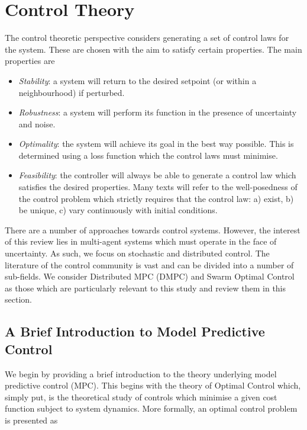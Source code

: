 \documentclass[.../main.tex]{subfiles}
\begin{document}
\section{Control Theory} \label{sec::Control_Theory}

The control theoretic perspective considers generating a set of control laws for the system. These
are chosen with the aim to satisfy certain properties. The main properties are

\begin{itemize}
    \item {\em Stability}: a system will return to the desired setpoint (or within a neighbourhood) if
    perturbed.

    \item {\em Robustness}: a system will perform its function in the presence of uncertainty and
    noise.

    \item {\em Optimality}: the system will achieve its goal in the best way possible. This is
    determined using a loss function which the control laws must minimise.

    \item {\em Feasibility}: the controller will always be able to generate a control law which
    satisfies the desired properties. Many texts will refer to the well-posedness of the control
    problem which strictly requires that the control law: a) exist, b) be unique, c) vary
    continuously with initial conditions.
\end{itemize}

There are a number of approaches towards control systems. However, the interest of this review lies
in multi-agent systems which must operate in the face of uncertainty. As such, we focus on
stochastic and distributed control. The literature of the control community is vast and can be
divided into a number of sub-fields. We consider Distributed MPC (DMPC) and Swarm Optimal Control as
those which are particularly relevant to this study and review them in this section.


\subsection{A Brief Introduction to Model Predictive Control} %
\label{sub:a_brief_introduction_to_model_predictive_control}

We begin by providing a brief introduction to the theory underlying model predictive control (MPC).
This begins with the theory of Optimal Control which, simply put, is the theoretical study of
controls which minimise a given cost function subject to system dynamics. More formally, an optimal
control problem is presented as
\end{document}
